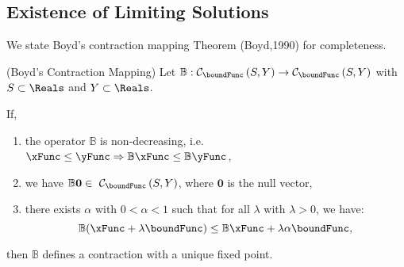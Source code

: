 \documentclass[\econtexRoot/BufferStockTheory]{subfiles}
\begin{document}
\hypertarget{It-Is-A-Contraction-Mapping}{}
\subsection{Existence of Limiting Solutions}\label{sec:Tcontractionmapping}



We state Boyd's contraction mapping Theorem (Boyd,1990) for completeness.

\begin{theorem}(Boyd's Contraction Mapping)\label{thm:Boyd}
Let $\mathbb{B}:\mathcal{C}_{\boundFunc }\left( S,Y\right)
  \rightarrow \mathcal{C}_{\boundFunc }\left(S,Y\right) $ with $S\subset \Reals$ and $Y\subset \Reals$.

If, 
\begin{enumerate}
  \item the operator $\mathbb{B}$ is non-decreasing, i.e.\ $\xFunc \leq \yFunc \Rightarrow\mathbb{B}{\xFunc } \leq \mathbb{B}{\yFunc}$,
  \item we have $\mathbb{B}\mathbf{0}\in ~ \mathcal{C}_{\boundFunc }\left(S,Y\right) $, where $\mathbf{0}$ is the null vector,
  \item there exists $\alpha$ with $0 < \alpha < 1$ such that for all $\lambda$ with $\lambda > 0$, we have:
             $$\mathbb{B}({\xFunc } +\lambda\boundFunc ) \leq \mathbb{B}{\xFunc } +\lambda\alpha \boundFunc,$$
\end{enumerate}
then $\mathbb{B}$ defines a contraction with a unique fixed point.
\end{theorem}
\end{document}
